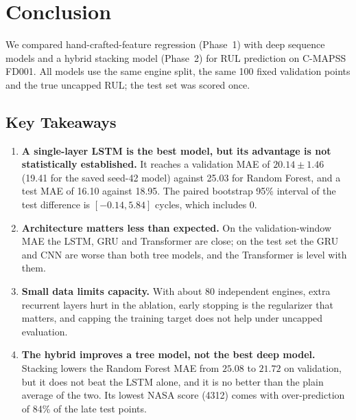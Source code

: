 \section{Conclusion}
\label{sec:conclusion}

We compared hand-crafted-feature regression (Phase~1) with deep sequence
models and a hybrid stacking model (Phase~2) for RUL prediction on C-MAPSS FD001.
All models use the same engine split, the same 100 fixed validation points and the true uncapped RUL;
the test set was scored once.

\subsection{Key Takeaways}
\begin{enumerate}
  \item \textbf{A single-layer LSTM is the best model, but its advantage is not statistically established.}
    It reaches a validation MAE of $20.14\pm1.46$ (19.41 for the saved seed-42 model) against 25.03 for Random Forest,
    and a test MAE of 16.10 against 18.95.  The paired bootstrap 95\% interval of the test difference is $[-0.14, 5.84]$ cycles, which includes 0.
  \item \textbf{Architecture matters less than expected.}  On the validation-window MAE the LSTM, GRU and Transformer are close; on the
    test set the GRU and CNN are worse than both tree models, and the Transformer is level with them.
  \item \textbf{Small data limits capacity.}  With about 80 independent engines, extra recurrent layers hurt in the ablation,
    early stopping is the regularizer that matters, and capping the training target does not help under uncapped evaluation.
  \item \textbf{The hybrid improves a tree model, not the best deep model.}  Stacking lowers the Random Forest MAE from $25.08$ to $21.72$ on validation,
    but it does not beat the LSTM alone, and it is no better than the plain average of the two.  Its lowest NASA score (4312) comes with
    over-prediction of 84\% of the late test points.
\end{enumerate}

